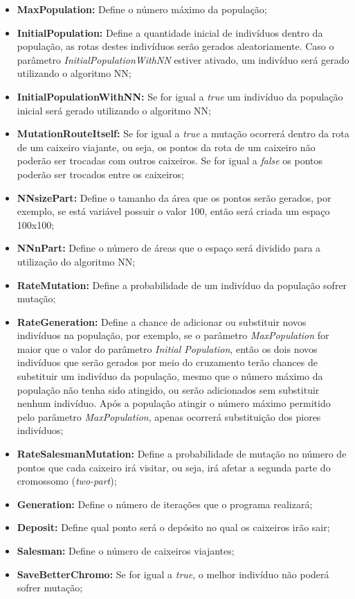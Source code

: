 \documentclass{abnt}
\begin{document}
			\begin{itemize}
				\item \textbf{MaxPopulation:} Define o número máximo da população; 
				\item \textbf{InitialPopulation:} Define a quantidade inicial de indivíduos dentro da população, as rotas destes indivíduos serão gerados aleatoriamente. Caso o parâmetro \textit{InitialPopulationWithNN} estiver ativado, um indivíduo será gerado utilizando o algoritmo NN;
				\item \textbf{InitialPopulationWithNN:} Se for igual a \textit{true} um indivíduo da população inicial será gerado utilizando o algoritmo NN;
				\item \textbf{MutationRouteItself:} Se for igual a \textit{true} a mutação ocorrerá dentro da rota de um caixeiro viajante, ou seja, os pontos da rota de um caixeiro não poderão ser trocadas com outros caixeiros. Se for igual a \textit{false} os pontos poderão ser trocados entre os caixeiros;
				\item \textbf{NNsizePart:} Define o tamanho da área que os pontos serão gerados, por exemplo, se está variável possuir o valor 100, então será criada um espaço 100x100;
				\item \textbf{NNnPart:} Define o número de áreas que o espaço será dividido para a utilização do algoritmo NN;
				\item \textbf{RateMutation:} Define a probabilidade de um indivíduo da população sofrer mutação;
				\item \textbf{RateGeneration:} Define a chance de adicionar ou substituir novos indivíduos na população, por exemplo, se o parâmetro \textit{MaxPopulation} for maior que o valor do parâmetro \textit{Initial Population}, então os dois novos indivíduos que serão gerados por meio do cruzamento terão chances de substituir um indivíduo da população, mesmo que o número máximo da população não tenha sido atingido, ou serão adicionados sem substituir nenhum indivíduo. Após a população atingir o número máximo permitido pelo parâmetro \textit{MaxPopulation}, apenas ocorrerá substituição dos piores indivíduos;
				\item \textbf{RateSalesmanMutation:} Define a probabilidade de mutação no número de pontos que cada caixeiro irá visitar, ou seja, irá afetar a segunda parte do cromossomo (\textit{two-part});
				\item \textbf{Generation:} Define o número de iterações que o programa realizará;
				\item \textbf{Deposit:} Define qual ponto será o depósito no qual os caixeiros irão sair;
				\item \textbf{Salesman:} Define o número de caixeiros viajantes;
				\item \textbf{SaveBetterChromo:} Se for igual a \textit{true}, o melhor indivíduo não poderá sofrer mutação;
			\end{itemize}
			
\end{document}
